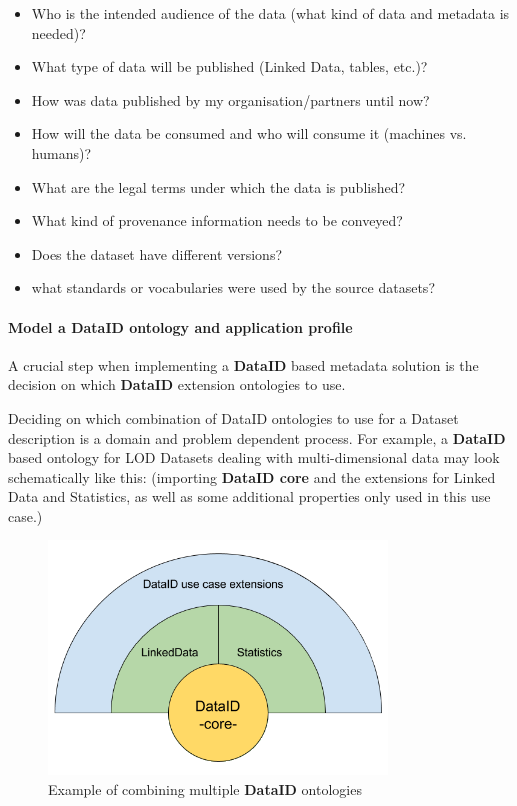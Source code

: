 \documentclass[a4paper,english,twoside,BCOR1.5cm,headsepline,DIV12,appendixprefix,final,12pt]{scrbook}
\newcommand{\dataid}{{\ttfamily\bfseries DataID}\xspace}
\newcommand{\core}{{\ttfamily\bfseries DataID core}\xspace}
\begin{document}
\begin{itemize}
\item Who is the intended audience of the data (what kind of data and metadata is needed)?
\item What type of data will be published (Linked Data, tables, etc.)?
\item How was data published by my organisation/partners until now?
\item How will the data be consumed and who will consume it (machines vs. humans)?
\item What are the legal terms under which the data is published?
\item What kind of provenance information needs to be conveyed?
\item Does the dataset have different versions?
\item what standards or vocabularies were used by the source datasets?
\end{itemize}

\paragraph{Model a DataID ontology and application profile}
\label{sec:wfmodel}
A crucial step when implementing a \dataid based metadata solution is the decision on which \dataid extension ontologies to use.


Deciding on which combination of DataID ontologies to use for a Dataset description is a domain and problem dependent process. For example, a \dataid based ontology for LOD Datasets dealing with multi-dimensional data may look schematically like this:
(importing \core and the extensions for Linked Data and Statistics, as well as some additional properties only used in this use case.)
\begin{figure}[!htbp]
\centering
  \includegraphics[width=9cm]{images/DataIDonionSliced.png}
  \caption{Example of combining multiple \dataid ontologies}
  \label{fig:onionslice}
\end{figure}
\end{document}
